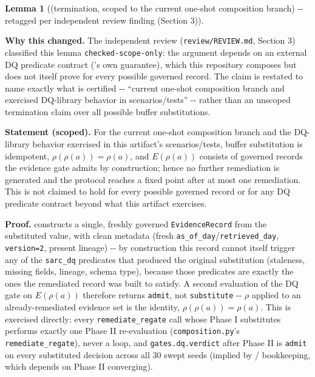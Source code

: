 \documentclass[11pt,a4paper]{article}
\theoremstyle{definition}
\newtheorem{lemma}{Lemma}
\begin{document}
\begin{lemma}[(termination, scoped to the current one-shot composition branch) -{}- retagged per independent review finding (Section 3)]
\label{lem:1}

\noindent\textbf{Why this changed.} The independent review (\texttt{review/REVIEW.md}, Section 3) classified this lemma \texttt{checked-scope-only}: the argument depends on an external DQ predicate contract ('s own guarantee), which this repository composes but does not itself prove for every possible governed record. The claim is restated to name exactly what is certified -{}- ``current one-shot composition branch and exercised DQ-library behavior in scenarios/tests'' -{}- rather than an unscoped termination claim over all possible buffer substitutions.

\noindent\textbf{Statement (scoped).} For the current one-shot composition branch and the DQ-library behavior exercised in this artifact's scenarios/tests, buffer substitution is idempotent, $\rho(\rho(a)) = \rho(a)$, and $E(\rho(a))$ consists of governed records the evidence gate admits by construction; hence no further remediation is generated and the protocol reaches a fixed point after at most one remediation. This is not claimed to hold for every possible governed record or for any DQ predicate contract beyond what this artifact exercises.

\noindent\textbf{Proof.}  constructs a single, freshly governed \texttt{EvidenceRecord} from the substituted value, with clean metadata (fresh \texttt{as\_of\_day}/\texttt{retrieved\_day}, \texttt{version=2}, present lineage) -{}- by construction this record cannot itself trigger any of the \texttt{sarc\_dq} predicates that produced the original substitution (staleness, missing fields, lineage, schema type), because those predicates are exactly the ones the remediated record was built to satisfy. A second evaluation of the DQ gate on $E(\rho(a))$ therefore returns \texttt{admit}, not \texttt{substitute} -{}- $\rho$ applied to an already-remediated evidence set is the identity, $\rho(\rho(a)) = \rho(a)$. This is exercised directly: every \texttt{remediate\_regate} call whose Phase I substitutes performs exactly one Phase II re-evaluation (\texttt{composition.py}'s \texttt{remediate\_regate}), never a loop, and \texttt{gates.dq.verdict} after Phase II is \texttt{admit} on every substituted decision across all 30 swept seeds (implied by / bookkeeping, which depends on Phase II converging).


\end{lemma}
\end{document}
